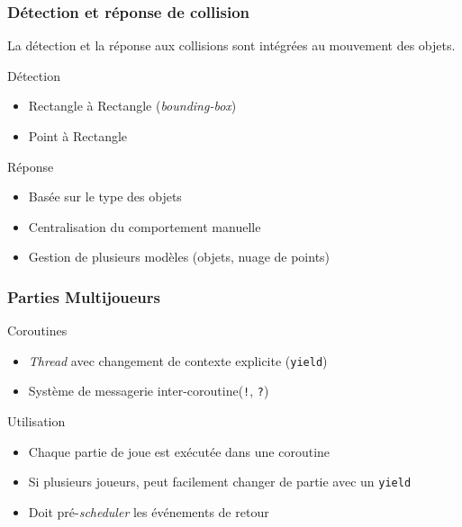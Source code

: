 \documentclass{beamer}
\newcommand{\<}[1]{\`#1}
\begin{document}
\begin{frame}
  \frametitle{Détection et réponse de collision}

  La détection et la réponse aux collisions sont intégrées au
  mouvement des objets.

  \begin{block}{Détection}
    \begin{itemize}
    \item Rectangle à Rectangle (\textit{bounding-box})
    \item Point à Rectangle
    \end{itemize}
  \end{block}

  \begin{block}{Réponse}
    \begin{itemize}
    \item Basée sur le \alert{type} des objets
    \item Centralisation du comportement \alert{manuelle}
    \item Gestion de plusieurs modèles (objets, nuage de points)
    \end{itemize}
  \end{block}
\end{frame}


\begin{frame}
  \frametitle{Parties Multijoueurs}

  \begin{block}{Coroutines}
    \begin{itemize}
    \item \textit{Thread} avec changement de contexte explicite
      (\texttt{yield})
    \item Système de messagerie inter-coroutine(\texttt{!}, \texttt{?})
    \end{itemize}
  \end{block}

  \begin{block}{Utilisation}
    \begin{itemize}
    \item Chaque partie de joue est exécutée dans une coroutine
    \item Si plusieurs joueurs, peut facilement changer de partie avec
      un \texttt{yield}
    \item Doit pré-\textit{scheduler} les événements de retour
    \end{itemize}
  \end{block}
\end{frame}
\end{document}
